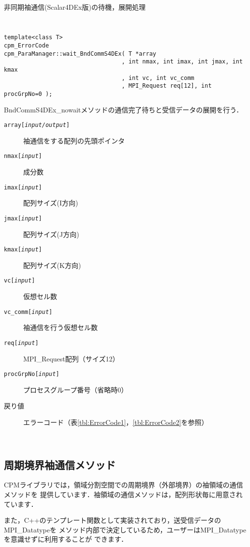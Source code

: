 \begin{spacing}{0.8}
\begin{itembox}[l]{非同期袖通信(Scalar4DEx版)の待機，展開処理}
{\tt
\begin{verbatim}
template<class T>
cpm_ErrorCode
cpm_ParaManager::wait_BndCommS4DEx( T *array
                                  , int nmax, int imax, int jmax, int kmax
                                  , int vc, int vc_comm
                                  , MPI_Request req[12], int procGrpNo=0 );
\end{verbatim}
}
BndCommS4DEx\_nowaitメソッドの通信完了待ちと受信データの展開を行う．
\begin{description}
\item[{\tt array[{\it input/output}]}] 袖通信をする配列の先頭ポインタ
\item[{\tt nmax[{\it input}]}] 成分数
\item[{\tt imax[{\it input}]}] 配列サイズ(I方向)
\item[{\tt jmax[{\it input}]}] 配列サイズ(J方向)
\item[{\tt kmax[{\it input}]}] 配列サイズ(K方向)
\item[{\tt vc[{\it input}]}] 仮想セル数
\item[{\tt vc\_comm[{\it input}]}] 袖通信を行う仮想セル数
\item[{\tt req[{\it input}]}] MPI\_Request配列（サイズ12）
\item[{\tt procGrpNo[{\it input}]}] プロセスグループ番号（省略時0）
\\
\item[戻り値] エラーコード（表\ref{tbl:ErrorCode1}，\ref{tbl:ErrorCode2}を参照）
\end{description}
\end{itembox}\\
\end{spacing}


\clearpage


\subsection{周期境界袖通信メソッド}
\label{pericomm}
CPMライブラリでは，領域分割空間での周期境界（外部境界）の袖領域の通信メソッドを
提供しています．袖領域の通信メソッドは，配列形状毎に用意されています．

また，C++のテンプレート関数として実装されており，送受信データのMPI\_Datatypeを
メソッド内部で決定しているため，ユーザーはMPI\_Datatypeを意識せずに利用することが
できます．

